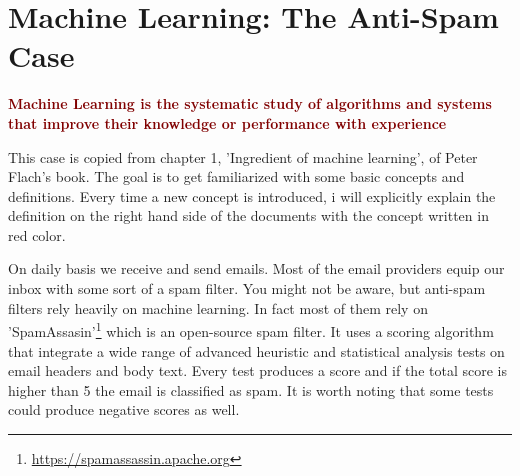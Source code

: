 \documentclass{tufte-handout}
\newcommand{\hlred}[1]{\textcolor{Maroon}{#1}}%
\begin{document}
\section{Machine Learning: The Anti-Spam Case}

\textbf{\hlred{Machine Learning is the systematic study of algorithms and systems that improve their knowledge or performance with experience}}\cite{Flach2012}

This case is copied from chapter 1, 'Ingredient of machine learning', of Peter Flach's book. The goal is to get familiarized with some basic concepts and definitions. Every time a new concept is introduced, i will explicitly explain the definition on the right hand side of the documents with the concept written in red color.

On daily basis we receive and send emails. Most of the email providers equip our inbox with some sort of a spam filter. You might not be aware, but anti-spam filters rely heavily on machine learning. In fact most of them rely on 'SpamAssasin'\footnote{\url{https://spamassassin.apache.org}} which is an open-source spam filter. 
It uses a scoring algorithm that integrate a wide range of advanced heuristic and statistical analysis tests on email headers and body text. Every test produces a score and if the total score is higher than 5 the email is classified as spam. It is worth noting that some tests could produce negative scores as well.
\end{document}
